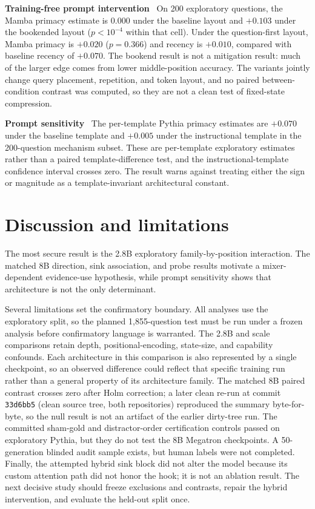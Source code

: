 \documentclass{article}
\newcommand{\runin}[1]{\par\medskip\noindent\textbf{#1}\ }
\begin{document}
\runin{Training-free prompt intervention}
On 200 exploratory questions, the Mamba primacy estimate is $0.000$ under the baseline layout and $+0.103$ under the bookended layout ($p<10^{-4}$ within that cell).
Under the question-first layout, Mamba primacy is $+0.020$ ($p=0.366$) and recency is $+0.010$, compared with baseline recency of $+0.070$.
The bookend result is not a mitigation result: much of the larger edge comes from lower middle-position accuracy.
The variants jointly change query placement, repetition, and token layout, and no paired between-condition contrast was computed, so they are not a clean test of fixed-state compression.

\runin{Prompt sensitivity}
The per-template Pythia primacy estimates are $+0.070$ under the baseline template and $+0.005$ under the instructional template in the 200-question mechanism subset.
These are per-template exploratory estimates rather than a paired template-difference test, and the instructional-template confidence interval crosses zero.
The result warns against treating either the sign or magnitude as a template-invariant architectural constant.

\section{Discussion and limitations}
\label{sec:discussion}

The most secure result is the 2.8B exploratory family-by-position interaction.
The matched 8B direction, sink association, and probe results motivate a mixer-dependent evidence-use hypothesis, while prompt sensitivity shows that architecture is not the only determinant.

Several limitations set the confirmatory boundary.
All analyses use the exploratory split, so the planned 1{,}855-question test must be run under a frozen analysis before confirmatory language is warranted.
The 2.8B and scale comparisons retain depth, positional-encoding, state-size, and capability confounds. Each architecture in this comparison is also represented by a single checkpoint, so an observed difference could reflect that specific training run rather than a general property of its architecture family.
The matched 8B paired contrast crosses zero after Holm correction; a later clean re-run at commit \texttt{33d6bb5} (clean source tree, both repositories) reproduced the summary byte-for-byte, so the null result is not an artifact of the earlier dirty-tree run.
The committed sham-gold and distractor-order certification controls passed on exploratory Pythia, but they do not test the 8B Megatron checkpoints.
A 50-generation blinded audit sample exists, but human labels were not completed.
Finally, the attempted hybrid sink block did not alter the model because its custom attention path did not honor the hook; it is not an ablation result.
The next decisive study should freeze exclusions and contrasts, repair the hybrid intervention, and evaluate the held-out split once.
\end{document}
